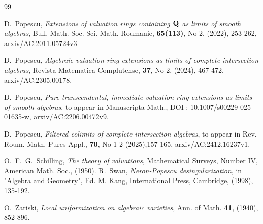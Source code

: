 \documentclass[12pt]{amsart}
\theoremstyle{definition}
\theoremstyle{subsection-tweak}
\theoremstyle{theorem}
\theoremstyle{definition}
\begin{document}
\begin{thebibliography}{99}
{  D.\ Popescu, {\em Extensions of valuation rings containing $\bf Q$ as limits of smooth algebras}, Bull. Math.  Soc. Sci. Math. Roumanie, {\bf 65(113)}, No 2, (2022), 253-262, arxiv/AC:2011.05724v3

 

   D.\ Popescu, {\em Algebraic valuation ring extensions as limits of complete intersection algebras},  Revista Matematica Complutense,  {\bf 37}, No 2, (2024), 467-472, arxiv/AC:2305.00178.

 
  D.\ Popescu, {\em Pure transcendental, immediate valuation ring extensions as limits of smooth algebras}, to appear in Manuscripta Math., DOI : 10.1007/s00229-025-01635-w,
arxiv/AC:2206.00472v9. 
 

  D.\ Popescu, {\em  Filtered colimits of complete intersection algebras}, to appear in Rev. Roum. Math. Pures Appl., {\bf 70}, No 1-2 (2025),157-165, arxiv/AC:2412.16237v1.

 O.\ F.\ G.\ Schilling, {\em The theory of valuations}, Mathematical Surveys, Number IV, American Math. Soc., (1950).
  R.\ Swan, {\em Neron-Popescu desingularization}, in "Algebra and Geometry", Ed. M. Kang, International Press, Cambridge, (1998), 135-192.


  O.\ Zariski, {\em Local uniformization on algebraic varieties}, Ann. of Math. {\bf 41}, (1940), 852-896.  
 




}
\end{thebibliography}

 
\end{document}
